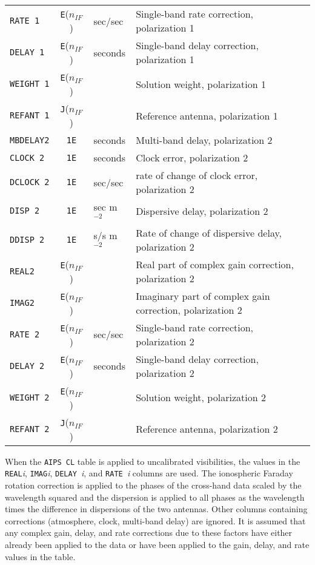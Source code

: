 \documentclass[twoside]{article}
\newcommand{\nif}{$n_{IF}$}
\begin{document}
\begin{center}
\begin{tabular}{lcll}
{\tt RATE 1}        & {\tt E}(\nif) & sec/sec & Single-band rate correction, polarization 1 \\
{\tt DELAY 1}       & {\tt E}(\nif) & seconds & Single-band delay correction, polarization 1 \\
{\tt WEIGHT 1}      & {\tt E}(\nif) & & Solution weight, polarization 1 \\
{\tt REFANT 1}      & {\tt J}(\nif) & & Reference antenna, polarization 1 \\
\hline
{\tt MBDELAY2}      & {\tt 1E} & seconds & Multi-band delay, polarization 2 \\
{\tt CLOCK 2}       & {\tt 1E} & seconds & Clock error, polarization 2 \\
{\tt DCLOCK 2}      & {\tt 1E} & sec/sec & rate of change of clock error, polarization 2 \\
{\tt DISP 2}        & {\tt 1E} & sec m$^{-2}$ & Dispersive delay, polarization 2 \\
{\tt DDISP 2}       & {\tt 1E} & s/s m$^{-2}$ & Rate of change of dispersive delay, polarization 2 \\
{\tt REAL2}         & {\tt E}(\nif) & & Real part of complex gain correction, polarization 2 \\
{\tt IMAG2}         & {\tt E}(\nif) & & Imaginary part of complex gain correction, polarization 2 \\
{\tt RATE 2}        & {\tt E}(\nif) & sec/sec & Single-band rate correction, polarization 2 \\
{\tt DELAY 2}       & {\tt E}(\nif) & seconds & Single-band delay correction, polarization 2 \\
{\tt WEIGHT 2}      & {\tt E}(\nif) & & Solution weight, polarization 2 \\
{\tt REFANT 2}      & {\tt J}(\nif) & & Reference antenna, polarization 2
\end{tabular}
\end{center}

When the {\tt AIPS CL} table is applied to uncalibrated visibilities,
the values in the {\tt REAL}{\it i}, {\tt IMAG}{\it i}, {\tt DELAY\
}{\it i}, and {\tt RATE\ }{\it i} columns are used.  The ionospheric
Faraday rotation correction is applied to the phases of the cross-hand
data scaled by the wavelength squared and the dispersion is applied to
all phases as the wavelength times the difference in dispersions of
the two antennas.  Other columns containing corrections (atmosphere,
clock, multi-band delay) are ignored.  It is assumed that any complex
gain, delay, and rate corrections due to these factors have either
already been applied to the data or have been applied to the gain,
delay, and rate values in the table.
\end{document}
